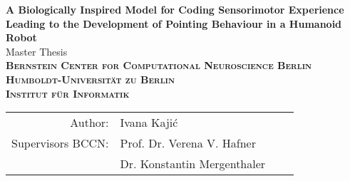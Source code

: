 \begin{titlepage}
\hspace{10cm}
\vspace{4cm}

\begin{center}
  \vspace{-4 cm}
  \huge{\bf A Biologically Inspired Model for Coding Sensorimotor Experience Leading to the Development of Pointing Behaviour in a Humanoid Robot} \\ %
  \vspace{5cm}
  \LARGE  Master Thesis \\ %

  \vspace{1cm}
  {\large
    \bf{
      \scshape
      Bernstein Center for Computational Neuroscience Berlin \\
      Humboldt-Universit\"at zu Berlin \\
      Institut f\"ur Informatik\\
    }
  } 

\vspace{1 cm}
{\large
  \begin{tabular}{rlll}
    Author:    & Ivana Kaji\'c && \\
    Supervisors BCCN: & Prof. Dr. Verena V. Hafner && \\
		      & Dr. Konstantin Mergenthaler && \\%

  \end{tabular}
}
\end{center}
\end{titlepage}
